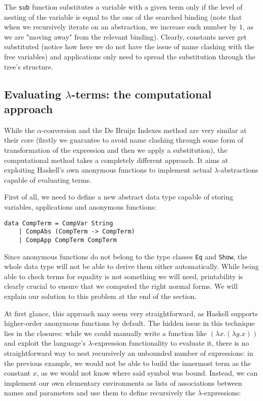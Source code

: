 \documentclass{article}
\begin{document}
The \lstinline|sub| function substitutes a variable with a given term only if the level of nesting of the variable is equal to the one of the searched binding (note that when we recursively iterate on an abstraction, we increase such number by $1$, as we are "moving away" from the relevant binding). Clearly, constants never get substituted (notice how here we do not have the issue of name clashing with the free variables) and applications only need to spread the substitution through the tree's structure.

\subsection{Evaluating $\lambda$-terms: the computational approach} \label{sec:computational}

While the $\alpha$-conversion and the De Bruijn Indexes method are very similar at their core (firstly we guarantee to avoid name clashing through some form of transformation of the expression and then we apply a substitution), the computational method takes a completely different approach. It aims at exploiting Haskell's own anonymous functions to implement actual $\lambda$-abstractions capable of evaluating terms.

First of all, we need to define a new abstract data type capable of storing variables, applications and anonymous functions:

\begin{lstlisting}
data CompTerm = CompVar String
    | CompAbs (CompTerm -> CompTerm)
    | CompApp CompTerm CompTerm
\end{lstlisting}

Since anonymous functions do not belong to the type classes \lstinline|Eq| and \lstinline|Show|, the whole data type will not be able to derive them either automatically. While being able to check terms for equality is not something we will need, printability is clearly crucial to ensure that we computed the right normal forms. We will explain our solution to this problem at the end of the section.

At first glance, this approach may seem very straightforward, as Haskell supports higher-order anonymous functions by default. The hidden issue in this technique lies in the closures: while we could manually write a function like $(\lambda x . (\lambda y . x))$ and exploit the language's $\lambda$-expression functionality to evaluate it, there is no straightforward way to nest recursively an unbounded number of expressions: in the previous example, we would not be able to build the innermost term as the constant $x$, as we would not know where said symbol was bound. Instead, we can implement our own elementary environments as lists of associations between names and parameters and use them to define recursively the $\lambda$-expressions:
\end{document}

